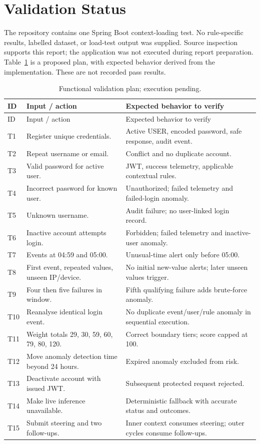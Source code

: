 \section{Validation Status}
The repository contains one Spring Boot context-loading test. No rule-specific results, labelled dataset, or load-test output was supplied. Source inspection supports this report; the application was not executed during report preparation. Table~\ref{tab:tests} is a proposed plan, with expected behavior derived from the implementation. These are not recorded pass results.
\begingroup\small{}\setlength{\parskip}{0pt}
\begin{longtable}{>{\raggedright\arraybackslash}p{0.9cm}>{\raggedright\arraybackslash}p{6.1cm}>{\raggedright\arraybackslash}p{7cm}}
\caption{Functional validation plan; execution pending.}\label{tab:tests}\\\toprule ID & Input / action & Expected behavior to verify\\\midrule\endfirsthead
\toprule ID & Input / action & Expected behavior to verify\\\midrule\endhead
T1 & Register unique credentials. & Active USER, encoded password, safe response, audit event.\\
T2 & Repeat username or email. & Conflict and no duplicate account.\\
T3 & Valid password for active user. & JWT, success telemetry, applicable contextual rules.\\
T4 & Incorrect password for known user. & Unauthorized; failed telemetry and failed-login anomaly.\\
T5 & Unknown username. & Audit failure; no user-linked login record.\\
T6 & Inactive account attempts login. & Forbidden; failed telemetry and inactive-user anomaly.\\
T7 & Events at 04:59 and 05:00. & Unusual-time alert only before 05:00.\\
T8 & First event, repeated values, unseen IP/device. & No initial new-value alerts; later unseen values trigger.\\
T9 & Four then five failures in window. & Fifth qualifying failure adds brute-force anomaly.\\
T10 & Reanalyse identical login event. & No duplicate event/user/rule anomaly in sequential execution.\\
T11 & Weight totals 29, 30, 59, 60, 79, 80, 120. & Correct boundary tiers; score capped at 100.\\
T12 & Move anomaly detection time beyond 24 hours. & Expired anomaly excluded from risk.\\
T13 & Deactivate account with issued JWT. & Subsequent protected request rejected.\\
T14 & Make live inference unavailable. & Deterministic fallback with accurate status and outcomes.\\
T15 & Submit steering and two follow-ups. & Inner context consumes steering; outer cycles consume follow-ups.\\\bottomrule
\end{longtable}
\endgroup

